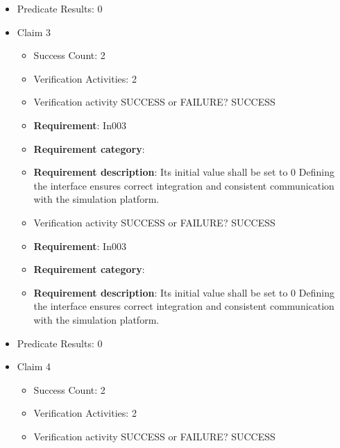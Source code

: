 \documentclass{article}
\begin{document}
\begin{itemize}
\begin{itemize}
					\item Verification activity SUCCESS or FAILURE? SUCCESS
		
						\item \textbf{Requirement}: In002 
						\item \textbf{Requirement category}: Interfacesexistance 
						\item \textbf{Requirement description}: Its initial value shall be set to 0 Defining the interface ensures correct integration and consistent communication with the simulation platform.
					
				\end{itemize}
				
									    
				\item Predicate Results: 0

  				  \item Claim 3
				\begin{itemize}
			    	\item Success Count: 2 
			    	\item Verification Activities: 2
					\item Verification activity SUCCESS or FAILURE? SUCCESS
		
						\item \textbf{Requirement}: In003 
						\item \textbf{Requirement category}:  
						\item \textbf{Requirement description}: Its initial value shall be set to 0 Defining the interface ensures correct integration and consistent communication with the simulation platform.
					
					\item Verification activity SUCCESS or FAILURE? SUCCESS
		
						\item \textbf{Requirement}: In003 
						\item \textbf{Requirement category}:  
						\item \textbf{Requirement description}: Its initial value shall be set to 0 Defining the interface ensures correct integration and consistent communication with the simulation platform.
					
				\end{itemize}
				
									    
				\item Predicate Results: 0

  				  \item Claim 4
				\begin{itemize}
			    	\item Success Count: 2 
			    	\item Verification Activities: 2
					\item Verification activity SUCCESS or FAILURE? SUCCESS
		

\end{itemize}
\end{itemize}
\end{document}
